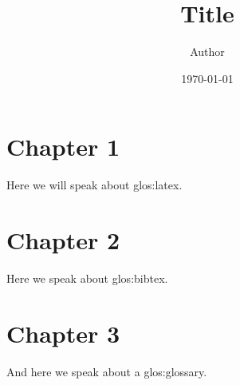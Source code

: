 \documentclass[10pt]{report}
\title{Title}
\author{Author}
\date{\today}
\begin{document}
\maketitle



\chapter{Chapter 1}
\label{sec:chapter-1}

Here we will speak about \gls{glos:latex}.


\chapter{Chapter 2}
\label{sec:chapter-2}

Here we speak about \gls{glos:bibtex}.

\chapter{Chapter 3}
\label{sec:chapter-3}

And here we speak about a \gls{glos:glossary}.


\renewcommand{\glossaryname}{Glossary about stuff}
\printglossary



\end{document}
